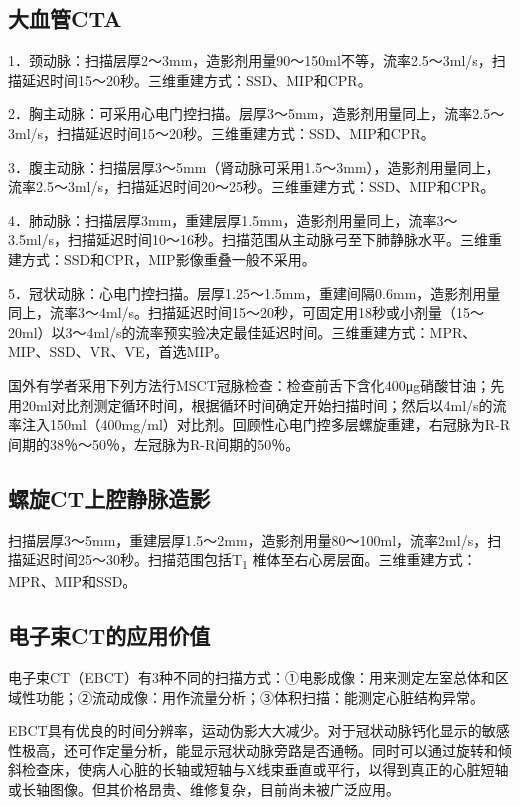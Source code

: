 \subsection{大血管CTA}

1．颈动脉：扫描层厚2～3mm，造影剂用量90～150ml不等，流率2.5～3ml/s，扫描延迟时间15～20秒。三维重建方式：SSD、MIP和CPR。

2．胸主动脉：可采用心电门控扫描。层厚3～5mm，造影剂用量同上，流率2.5～3ml/s，扫描延迟时间15～20秒。三维重建方式：SSD、MIP和CPR。

3．腹主动脉：扫描层厚3～5mm（肾动脉可采用1.5～3mm），造影剂用量同上，流率2.5～3ml/s，扫描延迟时间20～25秒。三维重建方式：SSD、MIP和CPR。

4．肺动脉：扫描层厚3mm，重建层厚1.5mm，造影剂用量同上，流率3～3.5ml/s，扫描延迟时间10～16秒。扫描范围从主动脉弓至下肺静脉水平。三维重建方式：SSD和CPR，MIP影像重叠一般不采用。

5．冠状动脉：心电门控扫描。层厚1.25～1.5mm，重建间隔0.6mm，造影剂用量同上，流率3～4ml/s。扫描延迟时间15～20秒，可固定用18秒或小剂量（15～20ml）以3～4ml/s的流率预实验决定最佳延迟时间。三维重建方式：MPR、MIP、SSD、VR、VE，首选MIP。

国外有学者采用下列方法行MSCT冠脉检查：检查前舌下含化400μg硝酸甘油；先用20ml对比剂测定循环时间，根据循环时间确定开始扫描时间；然后以4ml/s的流率注入150ml（400mg/ml）对比剂。回顾性心电门控多层螺旋重建，右冠脉为R-R间期的38％～50％，左冠脉为R-R间期的50％。

\subsection{螺旋CT上腔静脉造影}

扫描层厚3～5mm，重建层厚1.5～2mm，造影剂用量80～100ml，流率2ml/s，扫描延迟时间25～30秒。扫描范围包括T\textsubscript{1}
椎体至右心房层面。三维重建方式：MPR、MIP和SSD。

\subsection{电子束CT的应用价值}

电子束CT（EBCT）有3种不同的扫描方式：①电影成像：用来测定左室总体和区域性功能；②流动成像：用作流量分析；③体积扫描：能测定心脏结构异常。

EBCT具有优良的时间分辨率，运动伪影大大减少。对于冠状动脉钙化显示的敏感性极高，还可作定量分析，能显示冠状动脉旁路是否通畅。同时可以通过旋转和倾斜检查床，使病人心脏的长轴或短轴与X线束垂直或平行，以得到真正的心脏短轴或长轴图像。但其价格昂贵、维修复杂，目前尚未被广泛应用。


